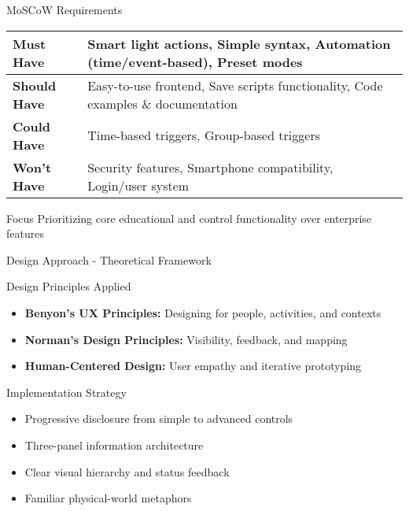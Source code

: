 \documentclass{beamer}
\begin{document}
\begin{frame}{MoSCoW Requirements}
\begin{table}[h]
\scriptsize
\begin{tabular}{|l|p{8cm}|}
\hline
\textbf{Must Have} & Smart light actions, Simple syntax, Automation (time/event-based), Preset modes \\
\hline
\textbf{Should Have} & Easy-to-use frontend, Save scripts functionality, Code examples \& documentation \\
\hline
\textbf{Could Have} & Time-based triggers, Group-based triggers \\
\hline
\textbf{Won't Have} & Security features, Smartphone compatibility, Login/user system \\
\hline
\end{tabular}
\end{table}

\begin{block}{Focus}
Prioritizing core educational and control functionality over enterprise features
\end{block}
\end{frame}

\begin{frame}{Design Approach - Theoretical Framework}
\begin{block}{Design Principles Applied}
\begin{itemize}
    \item \textbf{Benyon's UX Principles:} Designing for people, activities, and contexts
    \item \textbf{Norman's Design Principles:} Visibility, feedback, and mapping
    \item \textbf{Human-Centered Design:} User empathy and iterative prototyping
\end{itemize}
\end{block}

\begin{block}{Implementation Strategy}
\begin{itemize}
    \item Progressive disclosure from simple to advanced controls
    \item Three-panel information architecture
    \item Clear visual hierarchy and status feedback
    \item Familiar physical-world metaphors
\end{itemize}
\end{block}
\end{frame}
\end{document}
